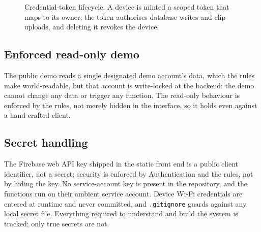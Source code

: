 \begin{figure}[ht]\centering
  \caption{Credential-token lifecycle. A device is minted a scoped token that maps to its owner; the
           token authorises database writes and clip uploads, and deleting it revokes the device.}
  \label{fig:token}
\end{figure}

\subsection{Enforced read-only demo}

The public demo reads a single designated demo account's data, which the rules make world-readable, but
that account is write-locked at the backend: the demo cannot change any data or trigger any function.
The read-only behaviour is enforced by the rules, not merely hidden in the interface, so it holds even
against a hand-crafted client.

\subsection{Secret handling}

The Firebase web API key shipped in the static front end is a public client identifier, not a secret;
security is enforced by Authentication and the rules, not by hiding the key. No service-account key is
present in the repository, and the functions run on their ambient service account. Device Wi-Fi
credentials are entered at runtime and never committed, and \texttt{.gitignore} guards against any
local secret file. Everything required to understand and build the system is tracked; only true
secrets are not.

